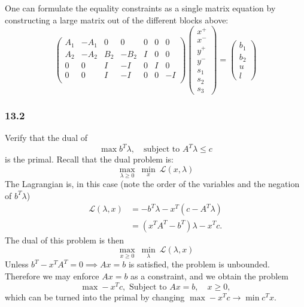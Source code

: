 One can formulate the equality constraints as a single matrix equation by constructing a large matrix out of the different blocks above:
\[
    \begin{pmatrix}
        A_1 & -A_1 & 0   & 0    & 0 & 0 & 0  \\
        A_2 & -A_2 & B_2 & -B_2 & I & 0 & 0  \\
        0   & 0    & I   & -I   & 0 & I & 0  \\
        0   & 0    & I   & -I   & 0 & 0 & -I \\
    \end{pmatrix}\begin{pmatrix}
        x^+ \\
        x^- \\
        y^+ \\
        y^- \\
        s_1 \\
        s_2 \\
        s_3
    \end{pmatrix} =
    \begin{pmatrix}
        b_1 \\
        b_2 \\
        u   \\
        l
    \end{pmatrix}
\]
\subsubsection{13.2}
Verify that the dual of
\[
    \operatorname{max} b^T\lambda, \quad \text{subject to } A^T\lambda \leq c
\]
is the primal.
Recall that the dual problem is:
\[
    \underset{\lambda \geq 0}{\operatorname{max}} \> \underset{x}{\operatorname{min}} \> \mathcal{L}(x, \lambda)
\]
The Lagrangian is, in this case (note the order of the variables and the negation of $b^T\lambda$)
\begin{align*}
    \mathcal{L}(\lambda, x) & = -b^T\lambda - x^T(c - A^T\lambda) \\
                            & = (x^T A^T - b^T)\lambda - x^T c.
\end{align*}
The dual of this problem is then
\[
    \underset{x \geq 0}{\operatorname{max}} \> \underset{\lambda}{\operatorname{min}} \> \mathcal{L}(\lambda, x)
\]
Unless $b^T - x^T A^T = 0 \implies Ax = b$ is satisfied, the problem is unbounded. Therefore we may enforce $Ax = b$ as a constraint, and we obtain the problem
\[
    \operatorname{max} -x^Tc, \text{ Subject to } Ax = b, \quad x \geq 0 ,
\]
which can be turned into the primal by changing $\operatorname{max} -x^Tc \to \operatorname{min} c^Tx$.
